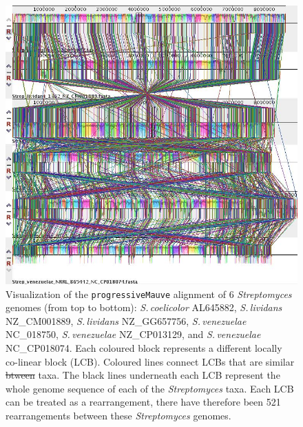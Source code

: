 \documentclass[11pt]{article}
\newcommand{\strep}{\textit{Streptomyces}\xspace}
\newcommand{\p}{\texttt{progressiveMauve}\xspace}
\newcommand{\sliv}{\textit{S.\,lividans}\xspace}
\newcommand{\sven}{\textit{S.\,venezuelae}\xspace}
\newcommand{\scoe}{\textit{S.\,coelicolor}\xspace}
\providecommand{\DIFaddtex}[1]{{\protect\color{blue}\uwave{#1}}} %
\providecommand{\DIFdeltex}[1]{{\protect\color{red}\sout{#1}}}                      %
\providecommand{\DIFaddFL}[1]{\DIFadd{#1}} %
\providecommand{\DIFdelFL}[1]{\DIFdel{#1}} %
\providecommand{\DIFaddbeginFL}{} %
\providecommand{\DIFaddendFL}{} %
\providecommand{\DIFdelbeginFL}{} %
\providecommand{\DIFdelendFL}{} %
\providecommand{\DIFadd}[1]{\texorpdfstring{\DIFaddtex{#1}}{#1}} %
\providecommand{\DIFdel}[1]{\texorpdfstring{\DIFdeltex{#1}}{}} %
\begin{document}
	\begin{figure}[H]
	\begin{center}
		\includegraphics[width=\textwidth]{./figs/6_strep_strains_mauve_aln_pic}
		\caption{\label{fig:strep6mauvealn} Visualization of the \p alignment of 6 \strep genomes (from top to bottom): \scoe AL645882, \sliv NZ\_CM001889, \sliv NZ\_GG657756, \sven NC\_018750, \sven NZ\_CP013129, and \sven NC\_CP018074. Each coloured block represents a different locally co-linear block (LCB). Coloured lines connect LCBs that are similar \DIFdelbeginFL \DIFdelFL{btween }\DIFdelendFL \DIFaddbeginFL \DIFaddFL{between }\DIFaddendFL taxa. The black lines underneath each LCB represent the whole genome sequence of each of the \strep taxa. Each LCB can be treated as a rearrangement, there have therefore been 521 rearrangements between these \strep genomes.}
	\end{center}
\end{figure}
\end{document}
